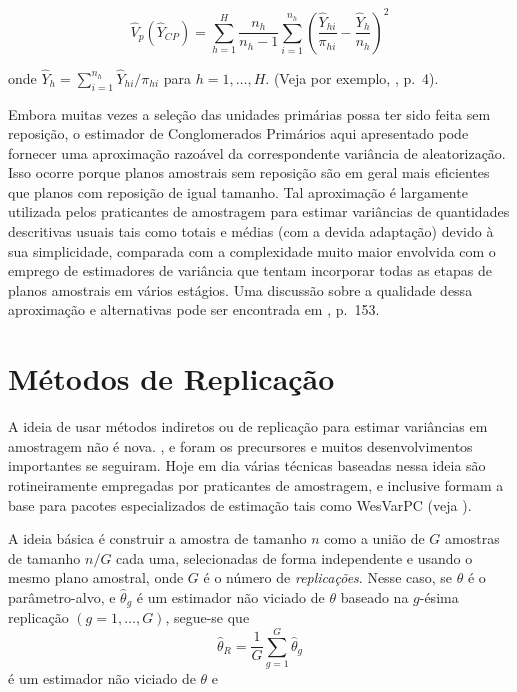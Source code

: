 \documentclass[]{book}
\theoremstyle{definition}
\theoremstyle{definition}
\theoremstyle{definition}
\theoremstyle{remark}
\begin{document}
\begin{equation}
\widehat{V}_{p}\left( \widehat{Y}_{CP}\right) =\sum_{h=1}^{H}\frac{n_{h}}
{n_{h}-1}\sum_{i=1}^{n_{h}}\left( \frac{\widehat{Y}_{hi}}{\pi _{hi}}-
\frac{\widehat{Y}_{h}}{n_{h}}\right) ^{2}  \label{eq:estpa23}
\end{equation}

onde \(\widehat{Y}_{h}=\sum_{i=1}^{n_{h}}\widehat{Y}_{hi}/\pi _{hi}\)
para \(h=1,\ldots ,H\). (Veja por exemplo, \citep{Sudaan93}, p.~4).

Embora muitas vezes a seleção das unidades primárias possa ter sido
feita sem reposição, o estimador de Conglomerados Primários aqui
apresentado pode fornecer uma aproximação razoável da correspondente
variância de aleatorização. Isso ocorre porque planos amostrais sem
reposição são em geral mais eficientes que planos com reposição de igual
tamanho. Tal aproximação é largamente utilizada pelos praticantes de
amostragem para estimar variâncias de quantidades descritivas usuais
tais como totais e médias (com a devida adaptação) devido à sua
simplicidade, comparada com a complexidade muito maior envolvida com o
emprego de estimadores de variância que tentam incorporar todas as
etapas de planos amostrais em vários estágios. Uma discussão sobre a
qualidade dessa aproximação e alternativas pode ser encontrada em
\citep{SSW92}, p.~153.

\section{Métodos de Replicação}\label{metodos-de-replicacao}

A ideia de usar métodos indiretos ou de replicação para estimar
variâncias em amostragem não é nova. \citep{Mahala39}, \citep{Mahala44}
e \citep{deming} foram os precursores e muitos desenvolvimentos
importantes se seguiram. Hoje em dia várias técnicas baseadas nessa
ideia são rotineiramente empregadas por praticantes de amostragem, e
inclusive formam a base para pacotes especializados de estimação tais
como WesVarPC (veja \citep{Westat}).

A ideia básica é construir a amostra de tamanho \(n\) como a união de
\(G\) amostras de tamanho \(n/G\) cada uma, selecionadas de forma
independente e usando o mesmo plano amostral, onde \(G\) é o número de
\emph{replicações}. Nesse caso, se \(\theta\) é o parâmetro-alvo, e
\(\widehat{\theta}_{g}\) é um estimador não viciado de \(\theta\)
baseado na \(g\)-ésima replicação \((g=1,\ldots ,G)\), segue-se que \[
\widehat{\theta }_{R}=\frac{1}{G}\sum_{g=1}^{G}\widehat{\theta }_{g} 
\] é um estimador não viciado de \(\theta\) e
\end{document}
